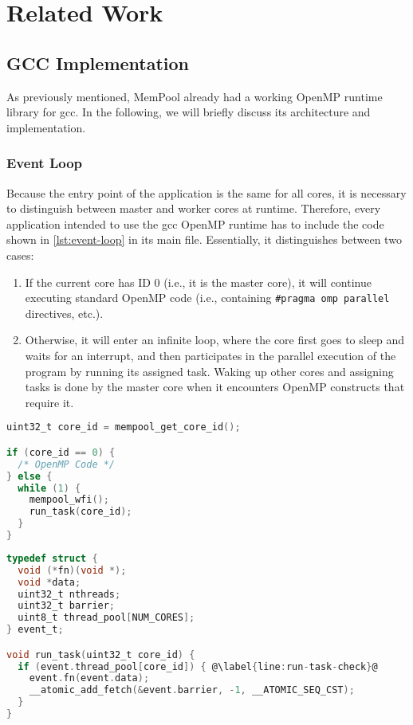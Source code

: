 \chapter{Related Work}
\label{ch:related_work}

\section{GCC Implementation}
\label{sec:gcc_implementation}

As previously mentioned, MemPool already had a working OpenMP runtime library for \gls{gcc}. In the
following, we will briefly discuss its architecture and implementation.

\subsection{Event Loop}
\label{subsec:event_loop}

Because the entry point of the application is the same for all cores, it is necessary to distinguish
between master and worker cores at runtime. Therefore, every application intended to use the
\gls{gcc} OpenMP runtime has to include the code shown in \cref{lst:event-loop} in its main file.
Essentially, it distinguishes between two cases:

\begin{enumerate}
	\item If the current core has ID 0 (i.e., it is the master core), it will continue executing
	      standard OpenMP code (i.e., containing \texttt{\#pragma omp parallel} directives, etc.).
	\item Otherwise, it will enter an infinite loop, where the core first goes to sleep and waits
	      for an interrupt, and then participates in the parallel execution of the program by
	      running its assigned task. Waking up other cores and assigning tasks is done by the
	      master core when it encounters OpenMP constructs that require it.
\end{enumerate}

\begin{lstlisting}[language=C, caption={Main Event Loop}, label={lst:event-loop}]
uint32_t core_id = mempool_get_core_id();

if (core_id == 0) {
  /* OpenMP Code */
} else {
  while (1) {
    mempool_wfi();
    run_task(core_id);
  }
}
\end{lstlisting}

\begin{lstlisting}[language=C, caption={run\_task Implementation}, label={lst:run-task},
                   escapechar=@]
typedef struct {
  void (*fn)(void *);
  void *data;
  uint32_t nthreads;
  uint32_t barrier;
  uint8_t thread_pool[NUM_CORES];
} event_t;

void run_task(uint32_t core_id) {
  if (event.thread_pool[core_id]) { @\label{line:run-task-check}@
    event.fn(event.data);
    __atomic_add_fetch(&event.barrier, -1, __ATOMIC_SEQ_CST);
  }
}
\end{lstlisting}


